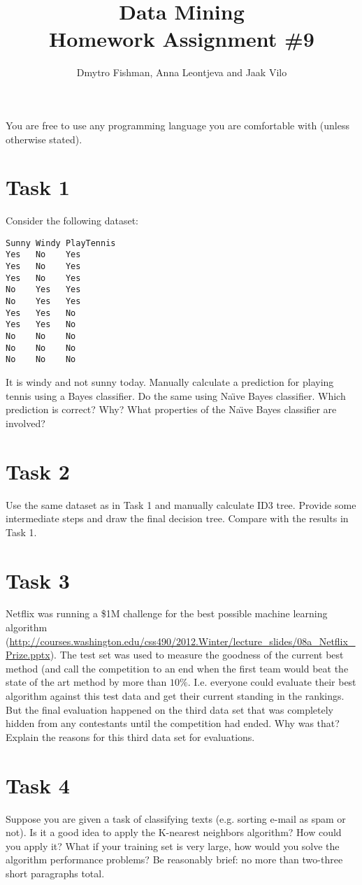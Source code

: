 \documentclass{article}
\title{Data Mining\\Homework Assignment \#9} %
\author{Dmytro Fishman, Anna Leontjeva and Jaak Vilo} %
\begin{document}
\maketitle %

You are free to use any programming language you are comfortable with (unless otherwise stated). 

\section*{Task 1}
Consider the following dataset:
\begin{verbatim}
Sunny Windy PlayTennis
Yes   No    Yes
Yes   No    Yes
Yes   No    Yes
No    Yes   Yes
No    Yes   Yes
Yes   Yes   No
Yes   Yes   No
No    No    No
No    No    No
No    No    No
\end{verbatim}
It is windy and not sunny today. Manually calculate a prediction for playing tennis using a Bayes classifier. Do the same using Na\"{\i}ve Bayes classifier. Which prediction is correct? Why? What properties of the Na\"{\i}ve Bayes classifier are involved? 

\section*{Task 2}
Use the same dataset as in Task 1 and manually calculate ID3 tree. Provide some intermediate steps and draw the final decision tree. Compare with the results in Task 1. 

\section*{Task 3}
Netflix was running a \$1M challenge for the best possible machine learning algorithm (\url{http://courses.washington.edu/css490/2012.Winter/lecture_slides/08a_Netflix_Prize.pptx}). The test set was used to measure the goodness of the current best method (and call the competition to an end when the first team would beat the state of the art method by more than $10\%$. I.e. everyone could evaluate their best algorithm against this test data and get their current standing in the rankings. But the final evaluation happened on the third data set that was completely hidden from any contestants until the competition had ended. Why was that? Explain the reasons for this third data set for evaluations.

\section*{Task 4}
Suppose you are given a task of classifying texts (e.g. sorting e-mail as spam or not). Is it a good idea to apply the K-nearest neighbors algorithm? How could you apply it? What if your training set is very large, how would you solve the algorithm performance problems?
Be reasonably brief: no more than two-three short paragraphs total.
\end{document}

